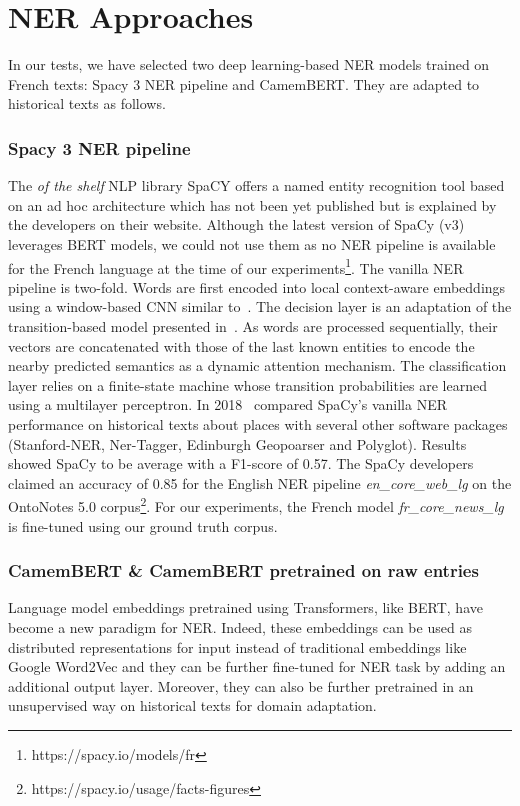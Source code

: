 \section{NER Approaches}

In our tests, we have selected two deep learning-based NER models trained on French texts: Spacy 3 NER pipeline and CamemBERT. They are adapted to  historical texts as follows.

\subsubsection{Spacy 3 NER pipeline}
The \textit{of the shelf} NLP library SpaCY offers a named entity recognition tool based on an ad hoc architecture which has not been yet published but is explained by the developers on their website. Although the latest version of SpaCy (v3) leverages BERT models, we could not use them as no NER pipeline is available for the French language at the time of our experiments\footnote{https://spacy.io/models/fr}.
The vanilla NER pipeline is two-fold. Words are first encoded into local context-aware embeddings using a window-based CNN similar to~\cite{collobert2011}.
The decision layer is an adaptation of the transition-based model presented in~\cite{lample2016}.
As words are processed sequentially, their vectors are concatenated with those of the last known entities to encode the nearby predicted semantics as a dynamic attention mechanism.
The classification layer relies on a finite-state machine whose transition probabilities are learned using a multilayer perceptron.
In 2018~\cite{won2018} compared SpaCy's vanilla NER performance on historical texts about places with several other software packages (Stanford-NER, Ner-Tagger, Edinburgh Geopoarser and Polyglot). Results showed SpaCy to be average with a F1-score of 0.57.
The SpaCy developers claimed an accuracy of 0.85 for the English NER pipeline \textit{en\_core\_web\_lg} on the OntoNotes 5.0 corpus\footnote{https://spacy.io/usage/facts-figures}.
For our experiments, the French model \textit{fr\_core\_news\_lg} is fine-tuned using our ground truth corpus.

\subsubsection{CamemBERT \& CamemBERT pretrained on raw entries}

Language model embeddings pretrained using Transformers, like BERT, have become a new paradigm for NER\cite{li2020}. Indeed, these embeddings can be used as distributed representations for input instead of traditional embeddings like Google Word2Vec and they can be further fine-tuned for NER task by adding an additional output layer. Moreover, they can also be further pretrained in an unsupervised way on historical texts for domain adaptation.

